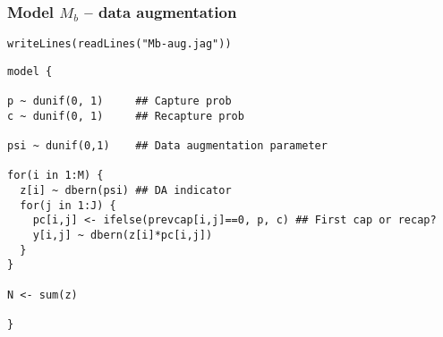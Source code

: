\documentclass[color=usenames,dvipsnames]{beamer}\usepackage[]{graphicx}\usepackage[]{xcolor}
\makeatletter
\newcommand{\hlstr}[1]{\textcolor[rgb]{0.749,0.012,0.012}{#1}}%
\newcommand{\hlstd}[1]{\textcolor[rgb]{0,0,0}{#1}}%
\newcommand{\hlkwd}[1]{\textcolor[rgb]{0.004,0.004,0.506}{#1}}%
\newenvironment{kframe}{%
 \def\at@end@of@kframe{}%
 \ifinner\ifhmode%
  \def\at@end@of@kframe{\end{minipage}}%
  \begin{minipage}{\columnwidth}%
 \fi\fi%
 \def\FrameCommand##1{\hskip\@totalleftmargin \hskip-\fboxsep
 \colorbox{shadecolor}{##1}\hskip-\fboxsep
     \hskip-\linewidth \hskip-\@totalleftmargin \hskip\columnwidth}%
 \MakeFramed {\advance\hsize-\width
   \@totalleftmargin\z@ \linewidth\hsize
   \@setminipage}}%
 {\par\unskip\endMakeFramed%
 \at@end@of@kframe}
\newenvironment{knitrout}{}{} %
\makeatother
\begin{document}
\begin{frame}[fragile]
  \frametitle{Model $M_b$ -- data augmentation}
\vspace{-3pt}
\begin{knitrout}\footnotesize
{}\color{fgcolor}\begin{kframe}
\begin{alltt}
\hlkwd{writeLines}\hlstd{(}\hlkwd{readLines}\hlstd{(}\hlstr{"Mb-aug.jag"}\hlstd{))}
\end{alltt}
\begin{verbatim}
model {

p ~ dunif(0, 1)     ## Capture prob
c ~ dunif(0, 1)     ## Recapture prob

psi ~ dunif(0,1)    ## Data augmentation parameter

for(i in 1:M) {     
  z[i] ~ dbern(psi) ## DA indicator
  for(j in 1:J) {
    pc[i,j] <- ifelse(prevcap[i,j]==0, p, c) ## First cap or recap?
    y[i,j] ~ dbern(z[i]*pc[i,j])
  }
}

N <- sum(z)

}
\end{verbatim}
\end{kframe}
\end{knitrout}
\end{frame}
\end{document}
